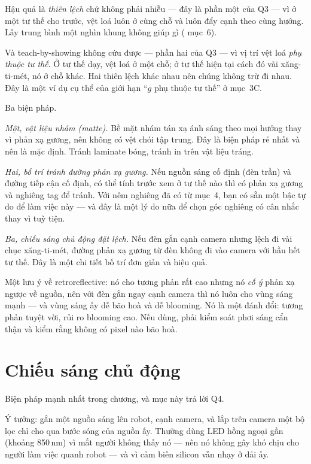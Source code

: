 \documentclass[../../marker.tex]{subfiles}
\begin{document}
Hậu quả là \emph{thiên lệch} chứ không phải nhiễu --- đây là phần một của Q3 --- vì ở một tư thế cho trước, vệt loá luôn ở cùng chỗ và luôn đẩy cạnh theo cùng hướng. Lấy trung bình một nghìn khung không giúp gì ( mục~6).

Và teach-by-showing không cứu được --- phần hai của Q3 --- vì vị trí vệt loá \emph{phụ thuộc tư thế}. Ở tư thế dạy, vệt loá ở một chỗ; ở tư thế hiện tại cách đó vài xăng-ti-mét, nó ở chỗ khác. Hai thiên lệch khác nhau nên chúng không trừ đi nhau. Đây là một ví dụ cụ thể của giới hạn ``\(g\) phụ thuộc tư thế'' ở  mục~3C.

Ba biện pháp.

\emph{Một, vật liệu nhám (matte).} Bề mặt nhám tán xạ ánh sáng theo mọi hướng thay vì phản xạ gương, nên không có vệt chói tập trung. Đây là biện pháp rẻ nhất và nên là mặc định. Tránh laminate bóng, tránh in trên vật liệu tráng.

\emph{Hai, bố trí tránh đường phản xạ gương.} Nếu nguồn sáng cố định (đèn trần) và đường tiếp cận cố định, có thể tính trước xem ở tư thế nào thì có phản xạ gương và nghiêng tag để tránh. Với nêm nghiêng đã có từ  mục~4, bạn có sẵn một bậc tự do để làm việc này --- và đây là một lý do nữa để chọn góc nghiêng có cân nhắc thay vì tuỳ tiện.

\emph{Ba, chiếu sáng chủ động đặt lệch.} Nếu đèn gắn cạnh camera nhưng lệch đi vài chục xăng-ti-mét, đường phản xạ gương từ đèn không đi vào camera với hầu hết tư thế. Đây là một chi tiết bố trí đơn giản và hiệu quả.

Một lưu ý về retroreflective: nó cho tương phản rất cao nhưng nó \emph{cố ý} phản xạ ngược về nguồn, nên với đèn gắn ngay cạnh camera thì nó luôn cho vùng sáng mạnh --- và vùng sáng ấy dễ bão hoà và dễ blooming. Nó là một đánh đổi: tương phản tuyệt vời, rủi ro blooming cao. Nếu dùng, phải kiểm soát phơi sáng cẩn thận và kiểm rằng không có pixel nào bão hoà.

\section{Chiếu sáng chủ động}

Biện pháp mạnh nhất trong chương, và mục này trả lời Q4.

Ý tưởng: gắn một nguồn sáng lên robot, cạnh camera, và lắp trên camera một bộ lọc chỉ cho qua bước sóng của nguồn ấy. Thường dùng LED hồng ngoại gần (khoảng 850\,nm) vì mắt người không thấy nó --- nên nó không gây khó chịu cho người làm việc quanh robot --- và vì cảm biến silicon vẫn nhạy ở dải ấy.
\end{document}
